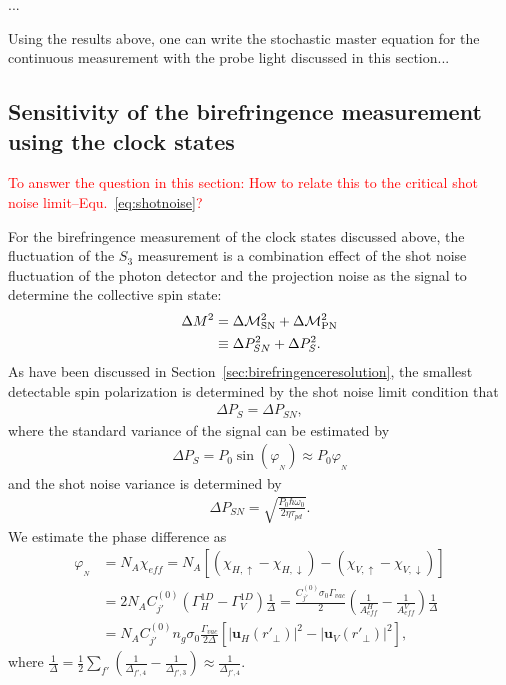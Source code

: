 \documentclass[]{report}
\begin{document}
...

Using the results above, one can write the stochastic master equation for the continuous measurement with the probe light discussed in this section...


\subsection{Sensitivity of the birefringence measurement using the clock states}
\textcolor{red}{To answer the question in this section: How to relate this to the critical shot noise limit--Equ.~\eqref{eq:shotnoise}?}  

For the birefringence measurement of the clock states discussed above, the fluctuation of the $ S_3 $ measurement is a combination effect of the shot noise fluctuation of the photon detector and the projection noise as the signal to determine the collective spin state:
\begin{align}
\Delta M^2 &= \Delta\mathcal{M}_{\rm SN}^2 + \Delta\mathcal{M}_{\rm PN}^2\\
&\equiv \Delta P^2_{SN} + \Delta P^2_S .
\end{align}
As have been discussed in Section~\ref{sec:birefringenceresolution}, the smallest detectable spin polarization is determined by the shot noise limit condition that 
\begin{align}
\Delta P_S = \Delta P_{SN},
\end{align}
where the standard variance of the signal can be estimated by
\begin{align}
\Delta P_S=P_0 \sin(\varphi_{_N}) \approx P_0 \varphi_{_N}
\end{align}
and the shot noise variance is determined by
\begin{align}
\Delta P_{SN} = \sqrt{\frac{P_0 \hbar \omega_0 }{2\eta \tau_{pd}}}.
\end{align}
We estimate the phase difference as
\begin{align}
\varphi_{_N} &= N_A \chi_{e\!f\!f}=N_A [(\chi_{H,\uparrow}-\chi_{H,\downarrow})-(\chi_{V,\uparrow}-\chi_{V,\downarrow})]\\
&= 2N_AC_{j'}^{(0)}(\Gamma_{H}^{1D}-\Gamma_V^{1D})\frac{1}{\Delta}=\frac{C_{j'}^{(0)}\sigma_0\Gamma_{vac}}{2}(\frac{1}{A^H_{e\!f\!f}}-\frac{1}{A^V_{e\!f\!f}})\frac{1}{\Delta}\\
&=N_AC_{j'}^{(0)}n_g\sigma_0\frac{\Gamma_{vac}}{2\Delta}\left[| \mathbf{u}_H(r'_{\!\perp})|^2- | \mathbf{u}_V(r'_{\!\perp})|^2 \right],
\end{align}
where $\frac{1}{\Delta}=\frac{1}{2}\sum_{f'}(\frac{1}{\Delta_{f',4}}-\frac{1}{\Delta_{f',3}})\approx \frac{1}{\Delta_{f',4}}$.
\end{document}
